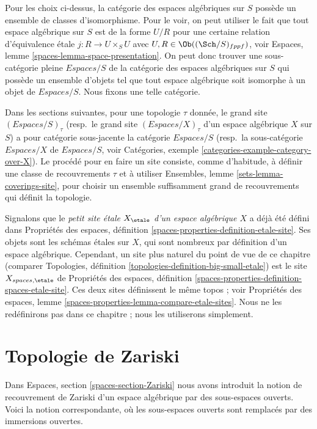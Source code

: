 \medskip\noindent
Pour les choix ci-dessus, la catégorie des espaces algébriques sur $S$
possède un ensemble de classes d'isomorphisme. Pour le voir, on peut utiliser le
fait que tout espace algébrique sur $S$ est de la forme $U/R$ pour
une certaine relation d'équivalence \'etale $j : R \to U \times_S U$ avec
$U, R \in \Ob((\Sch/S)_{fppf})$, voir
Espaces, lemme \ref{spaces-lemma-space-presentation}.
On peut donc trouver une sous-catégorie pleine $\textit{Espaces}/S$ de la catégorie des
espaces algébriques sur $S$ qui possède un ensemble d'objets
tel que tout espace algébrique soit isomorphe à un objet de
$\textit{Espaces}/S$. Nous fixons une telle catégorie.

\medskip\noindent
Dans les sections suivantes, pour une topologie $\tau$ donnée, le grand site
$(\textit{Espaces}/S)_\tau$ (resp.\ le grand site $(\textit{Espaces}/X)_\tau$
d'un espace algébrique $X$ sur $S$)
a pour catégorie sous-jacente la catégorie $\textit{Espaces}/S$
(resp.\ la sous-catégorie $\textit{Espaces}/X$ de $\textit{Espaces}/S$, voir
Catégories, exemple \ref{categories-example-category-over-X}).
Le procédé pour en faire un site consiste, comme d'habitude, à définir une
classe de recouvrements $\tau$ et à utiliser
Ensembles, lemme \ref{sets-lemma-coverings-site},
pour choisir un ensemble suffisamment grand de recouvrements qui définit la topologie.

\medskip\noindent
Signalons que le {\it petit site \'etale $X_\etale$
d'un espace algébrique $X$} a déjà été défini dans
Propriétés des espaces, définition
\ref{spaces-properties-definition-etale-site}.
Ses objets sont les schémas \'etales sur $X$, qui sont nombreux
par définition d'un espace algébrique. Cependant,
un site plus naturel du point de vue de ce chapitre (comparer
Topologies, définition \ref{topologies-definition-big-small-etale})
est le site $X_{spaces, \etale}$ de
Propriétés des espaces, définition
\ref{spaces-properties-definition-spaces-etale-site}.
Ces deux sites définissent le même topos ; voir
Propriétés des espaces, lemme \ref{spaces-properties-lemma-compare-etale-sites}.
Nous ne les redéfinirons pas dans ce chapitre ; nous les
utiliserons simplement.






\section{Topologie de Zariski}
\label{section-zariski}

\noindent
Dans
Espaces, section \ref{spaces-section-Zariski}
nous avons introduit la notion de recouvrement de Zariski d'un espace algébrique par
des sous-espaces ouverts. Voici la notion correspondante, où les sous-espaces ouverts
sont remplacés par des immersions ouvertes.

